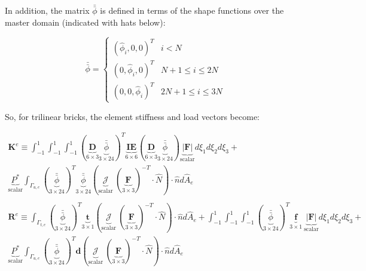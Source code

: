 \documentclass[10pt]{article}
\begin{document}
In addition, the matrix \(\bar{\bar{\phi}}\) is defined in terms of the shape functions over the master domain (indicated with hats below):

\begin{equation}
\bar{\bar{\phi}}=
\begin{cases}(\hat{\phi}_i, 0, 0)^T & i < N\\(0, \hat{\phi}_i, 0)^T & N+1\leq i\leq 2N \\ (0, 0, \hat{\phi}_i)^T & 2N+1\leq i\leq 3N
\end{cases}
\end{equation}

So, for trilinear bricks, the element stiffness and load vectors become:

\begin{tcolorbox}
\begin{equation}
\label{eq:FEWeakForm_element2}
\begin{aligned}
\textbf{K}^e\equiv\int_{-1}^{1}\int_{-1}^{1}\int_{-1}^{1}(\underbrace{\textbf{D}}_{6\times3}\underbrace{\bar{\bar{\phi}}}_{3\times24})^T\underbrace{\textbf{IE}}_{6\times6}(\underbrace{\textbf{D}}_{6\times3}\underbrace{\bar{\bar{\phi}}}_{3\times24})\underbrace{|\textbf{F}|}_\text{scalar}d\xi_1d\xi_2d\xi_3 +\quad\\
\underbrace{P^{*}}_\text{scalar}\int_{\Gamma_{u,e}}(\underbrace{\bar{\bar{\phi}}}_{3\times24})^T\underbrace{\bar{\bar{\phi}}}_{3\times24}(\underbrace{\mathscr{J}}_\text{scalar}\ (\underbrace{\textbf{F}}_{3\times3})^{-T}\cdot\hat{N})\cdot\hat{n}d\hat{A}_e\\
\ \\
\textbf{R}^e\equiv\int_{\Gamma_{t,e}}(\underbrace{\bar{\bar{\phi}}}_{3\times24})^T\underbrace{\textbf{t}}_{3\times1}(\underbrace{\mathscr{J}}_\text{scalar}\ (\underbrace{\textbf{F}}_{3\times3})^{-T}\cdot\hat{N})\cdot\hat{n}d\hat{A}_e+\int_{-1}^{1}\int_{-1}^{1}\int_{-1}^{1}(\underbrace{\bar{\bar{\phi}}}_{3\times24})^T\underbrace{\textbf{f}}_{3\times1}\ \underbrace{|\textbf{F}|}_\text{scalar}d\xi_1d\xi_2d\xi_3+\quad\\
\underbrace{P^{*}}_\text{scalar}\int_{\Gamma_{u,e}}(\underbrace{\bar{\bar{\phi}}}_{3\times24})^T\textbf{d}(\underbrace{\mathscr{J}}_\text{scalar}\ (\underbrace{\textbf{F}}_{3\times3})^{-T}\cdot\hat{N})\cdot\hat{n}d\hat{A}_e\\
\end{aligned}
\end{equation}
\end{tcolorbox}
\end{document}
